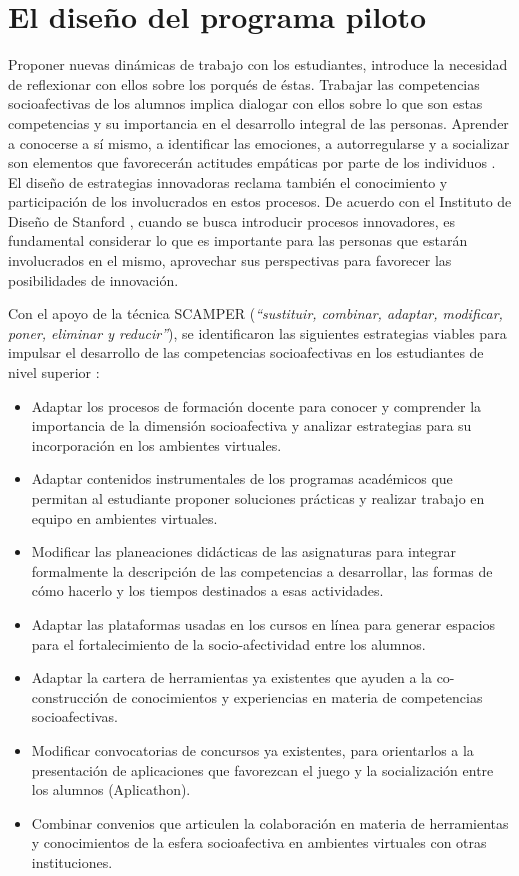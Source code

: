\documentclass[spanish]{textolivre}
\begin{document}
\section{El diseño del programa piloto}
Proponer nuevas dinámicas de trabajo con los estudiantes, introduce la necesidad de reflexionar con ellos sobre los porqués de éstas. Trabajar las competencias socioafectivas de los alumnos implica dialogar con ellos sobre lo que son estas competencias y su importancia en el desarrollo integral de las personas. Aprender a conocerse a sí mismo, a identificar las emociones, a autorregularse y a socializar son elementos que favorecerán actitudes empáticas por parte de los individuos \cite{mikulic2015}. El diseño de estrategias innovadoras reclama también el conocimiento y participación de los involucrados en estos procesos. De acuerdo con el Instituto de Diseño de Stanford \cite[p. 5-6]{plattner2012}, cuando se busca introducir procesos innovadores, es fundamental considerar lo que es importante para las personas que estarán involucrados en el mismo, aprovechar sus perspectivas para favorecer las posibilidades de innovación.

Con el apoyo de la técnica SCAMPER (\emph{“sustituir, combinar, adaptar, modificar, poner, eliminar y reducir”}), \cite{mosqueda} se identificaron las siguientes estrategias viables para impulsar el desarrollo de las competencias socioafectivas en los estudiantes de nivel superior \cite{huertacuervo2020}: 

\begin{itemize}
    \item Adaptar los procesos de formación docente para conocer y comprender la importancia de la dimensión socioafectiva y analizar estrategias para su incorporación en los ambientes virtuales. 
    \item Adaptar contenidos instrumentales de los programas académicos que permitan al estudiante proponer soluciones prácticas y realizar trabajo en equipo en ambientes virtuales. 
    \item Modificar las planeaciones didácticas de las asignaturas para integrar formalmente la descripción de las competencias a desarrollar, las formas de cómo hacerlo y los tiempos destinados a esas actividades.  \item Adaptar las plataformas usadas en los cursos en línea para generar espacios para el fortalecimiento de la socio-afectividad entre los alumnos. 
    \item Adaptar la cartera de herramientas ya existentes que ayuden a la co-construcción de conocimientos y experiencias en materia de competencias socioafectivas. \item Modificar convocatorias de concursos ya existentes, para orientarlos a la presentación de aplicaciones que favorezcan el juego y la socialización entre los alumnos (Aplicathon).
    \item Combinar convenios que articulen la colaboración en materia de herramientas y conocimientos de la esfera socioafectiva en ambientes virtuales con otras instituciones.
\end{itemize}
\end{document}
